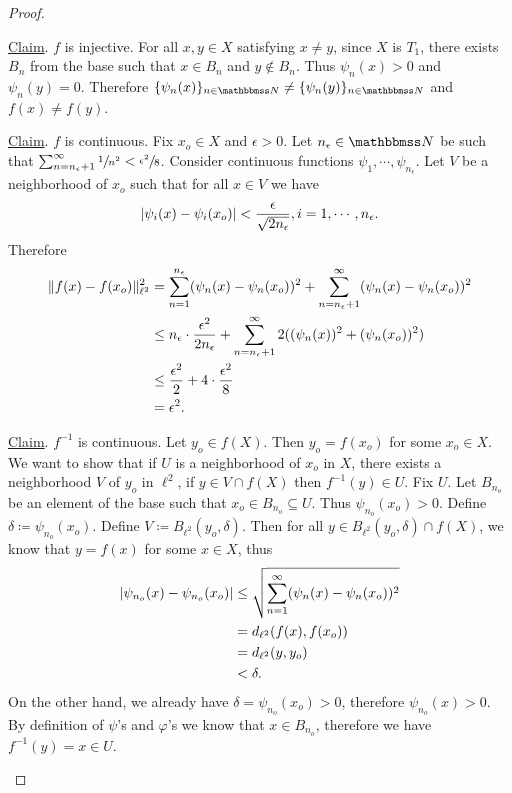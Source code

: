 \documentclass[screen,single]{techreport}
\numberwithin{equation}{section}
\begin{document}
\begin{proof}
\begin{itemize}
    \underline{Claim}. $f$ is injective.
    For all $x,y \in X$ satisfying $x \neq y$, since $X$ is $T_1$, there exists $B_n$ from the base such that $x \in B_n$ and $y \not\in B_n$.
    Thus $\psi_n(x) > 0$ and $\psi_n(y) = 0$.
    Therefore $\{\psi_n(x)\}_{n \in \bbN} \neq \{ \psi_n(y)\}_{n \in \bbN}$ and $f(x) \neq f(y)$.
    
    \underline{Claim}. $f$ is continuous.
    Fix $x_o \in X$ and $\epsilon > 0$.
    Let $n_\epsilon \in \bbN$ be such that $\sum_{n = n_\epsilon+1}^\infty \sfrac{1}{n^2} < \sfrac{\epsilon^2}{8}$.
    Consider continuous functions $\psi_1,\cdots,\psi_{n_\epsilon}$.
    Let $V$ be a neighborhood of $x_o$ such that for all $x \in V$ we have
    \[
    |{\psi_i(x) - \psi_i(x_o)}| < \frac{\epsilon}{\sqrt{2n_\epsilon}}, i = 1,\cdots,n_\epsilon.
    \]
    Therefore
    \begin{align*}
      \|{f(x) - f(x_o)}\|_{\ell^2}^2 & = \sum_{n=1}^{n_\epsilon} ({ \psi_n(x) - \psi_n(x_o)})^2 + \sum_{n=n_\epsilon+1}^\infty ({ \psi_n(x) - \psi_n(x_o)})^2 \\
      & \le n_\epsilon \cdot \frac{\epsilon^2}{2n_\epsilon} +   \sum_{n=n_\epsilon+1}^\infty 2({ ({\psi_n(x)})^2 + ({\psi_n(x_o)})^2}) \\
      & \le \frac{\epsilon^2}{2} + 4 \cdot \frac{\epsilon^2}{8} \\
      & = \epsilon^2.
    \end{align*}
    
    \underline{Claim}. $f^{-1}$ is continuous.
    Let $y_o \in f(X)$. Then $y_o = f(x_o)$ for some $x_o \in X$.
    We want to show that if $U$ is a neighborhood of $x_o$ in $X$, there exists a neighborhood $V$ of $y_o$ in $\ell^2$, if $y \in V \cap f(X)$ then $f^{-1}(y) \in U$.
    Fix $U$.
    Let $B_{n_o}$ be an element of the base such that $x_o \in B_{n_o} \subseteq U$.
    Thus $\psi_{n_o}(x_o) > 0$.
    Define $\delta \coloneqq \psi_{n_o}(x_o)$.
    Define $V \coloneqq B_{\ell^2}(y_o,\delta)$.
    Then for all $y \in B_{\ell^2}(y_o,\delta) \cap f(X)$, we know that $y = f(x)$ for some $x \in X$, thus
    \begin{align*}
      |{\psi_{n_o}(x) - \psi_{n_o}(x_o)}| & \le \sqrt{\sum_{n=1}^\infty ({ \psi_{n}(x) - \psi_n(x_o) })^2} \\
      & = d_{\ell^2}(f(x),f(x_o)) \\
      & = d_{\ell^2}(y,y_o) \\
      & < \delta.  
    \end{align*}
    On the other hand, we already have $\delta = \psi_{n_o}(x_o) > 0$, therefore $\psi_{n_o}(x) > 0$.
    By definition of $\psi$'s and $\varphi$'s we know that $x \in B_{n_o}$, therefore we have $f^{-1}(y) = x \in U$.
  \end{itemize}
\end{proof}
\end{document}
